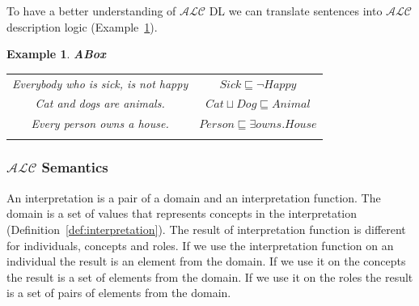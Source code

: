 \documentclass[12pt,a4paper]{article}
\newtheorem{example}{Example}[subsection]
\begin{document}
To have a better understanding of $\mathcal{ALC}$ DL we can translate sentences into $\mathcal{ALC}$ description logic (Example~\ref{example:sentences}).

\begin{example}{\textbf{ABox}}
	\label{example:sentences}
	
	\begin{table}[H]
		\centering
		\begin{tabular}{c c}
			Everybody who is sick, is not happy & $Sick \sqsubseteq \neg Happy$ \\ \addlinespace[0.4cm]
			Cat and dogs are animals. & $Cat \sqcup Dog \sqsubseteq Animal$ \\ \addlinespace[0.4cm]
			Every person owns a house. & $Person \sqsubseteq \exists owns.House$ \\	\addlinespace[0.4cm]
		\end{tabular}		
	\end{table}
\end{example}

\subsubsection{$\mathcal{ALC}$ Semantics}
An interpretation is a pair of a domain and an interpretation function. The domain is a set of values that represents concepts in the interpretation (Definition~\ref{def:interpretation}). The result of interpretation function is different for individuals, concepts and roles. If we use the interpretation function on an individual the result is an element from the domain. If we use it on the concepts the result is a set of elements from the domain. If we use it on the roles the result is a set of pairs of elements from the domain.
\end{document}
